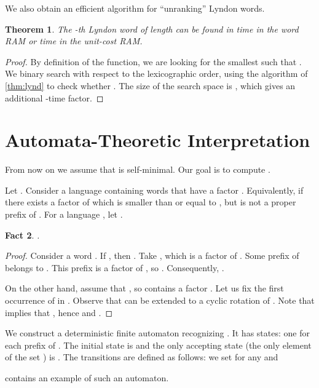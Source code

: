 \documentclass{article}
\newcommand{\mayqed}{}
\newtheorem{theorem}{Theorem}
\newtheorem{fact}[theorem]{Fact}
\theoremstyle{definition}
\theoremstyle{remark}
\begin{document}
We also obtain an efficient algorithm for ``unranking'' Lyndon words.

\begin{theorem}\label{thm:kth}
  The -th Lyndon word of length  can be found in  time in the word RAM
  or  time in the unit-cost RAM.
\end{theorem}
\begin{proof}
  By definition of the  function, we are looking for the smallest   such that .
  We binary search  with respect to the lexicographic order, using the algorithm of \cref{thm:lynd}
  to check whether .
  The size of the search space is ,  which gives an additional -time factor.
\mayqed\end{proof}









\section{Automata-Theoretic Interpretation}\label{sec:auto}
From now on we assume that  is self-minimal.
Our goal is to compute .

\newcommand{\Pref}{\mathrm{Pref}}
Let .
Consider a language  containing words that have a factor .
Equivalently,  if there exists a factor of  which is smaller than or equal to ,
but is not a proper prefix of .
For a language , let .
\begin{fact}\label{fct:char}
  .
\end{fact}
\begin{proof}
  Consider a word . 
  If , then .
  Take , which is a factor of .
  Some prefix of  belongs to .
  This prefix is a factor of , so .
  Consequently, .

  On the other hand, assume that , so  contains a factor .
  Let us fix the first occurrence of  in . Observe that  can be extended to a cyclic rotation  of .
  Note that  implies that ,
  hence  and .
\mayqed\end{proof}

\noindent
We construct a deterministic finite automaton  recognizing .
It has  states: one for each prefix of .
The initial state is  and the only accepting state (the only element of the set ) is .
The transitions are defined as follows: we set  for any  and 

 contains an example of such an automaton.
\end{document}

